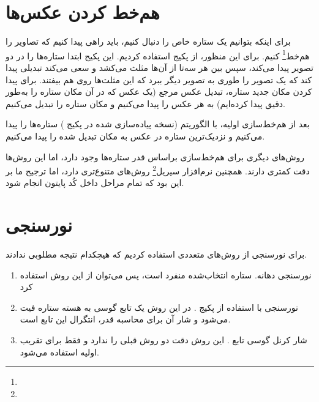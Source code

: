 \documentclass[12pt,a4paper]{article}
\begin{document}
	\section{هم‌خط کردن عکس‌ها}
	برای اینکه بتوانیم یک ستاره خاص را دنبال کنیم، باید راهی پیدا کنیم که تصاویر را هم‌خط\footnote{} کنیم.
	برای این منظور، از پکیج  استفاده کردیم. این پکیج ابتدا ستاره‌ها را در دو تصویر پیدا می‌کند،
	سپس بین هر سه‌تا از آن‌ها مثلث می‌کشد و سعی می‌کند تبدیلی پیدا کند که یک تصویر را طوری به تصویر دیگر ببرد که این
	مثلث‌ها روی هم بیفتند. برای پیدا کردن مکان جدید ستاره، تبدیل عکس مرجع (یک عکس که در آن مکان ستاره را به‌طور دقیق
	پیدا کرده‌ایم) به هر عکس را پیدا می‌کنیم و مکان ستاره را تبدیل می‌کنیم.
	
	بعد از هم‌خط‌سازی اولیه، با الگوریتم  (نسخه پیاده‌سازی شده در پکیج ) ستاره‌ها را
	پیدا می‌کنیم و نزدیک‌ترین ستاره در عکس به مکان تبدیل شده را پیدا می‌کنیم.
	
	روش‌های دیگری برای هم‌خط‌سازی براساس قدر ستاره‌ها وجود دارد، اما این روش‌ها دقت کمتری دارند. همچنین نرم‌افزار
	سیریل\footnote{} روش‌های متنوع‌تری دارد، اما ترجیح ما بر این بود که تمام مراحل داخل کُد پایتون انجام شود.
	\section{نورسنجی}
	برای نورسنجی از روش‌های متعددی استفاده کردیم که هیچکدام نتیجه مطلوبی ندادند.
	\begin{enumerate}
		\item نورسنجی دهانه. ستاره انتخاب‌شده منفرد است، پس می‌توان از این روش استفاده کرد
		\item نورسنجی  با استفاده از پکیج . در این روش یک تابع گوسی به هسته ستاره
		فیت می‌شود و شار آن برای محاسبه قدر، انتگرال این تابع است.
		\item شار کرنل گوسی تابع . این روش دقت دو روش قبلی را ندارد و فقط برای تقریب اولیه استفاده می‌شود.
	\end{enumerate}
\end{document}
